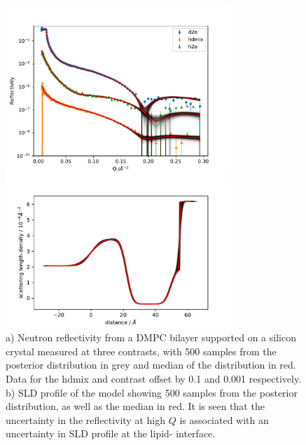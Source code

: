\documentclass[pdf,preprint]{iucr}
\begin{document}
\begin{figure}%
\centering
\label{fig:global_fit}%
\includegraphics[width=85mm]{./supporting_information/global_fit.pdf}%

\includegraphics[width=85mm]{./supporting_information/d2o_sld_spread.pdf}

\caption{a) Neutron reflectivity from a DMPC bilayer supported on a silicon crystal measured at three contrasts, with 500 samples from the posterior distribution in grey and median of the distribution in red. Data for the hdmix and  contrast offset by 0.1 and 0.001 respectively. b) SLD profile of the  model showing 500 samples from the posterior distribution, as well as the median in red. It is seen that the uncertainty in the reflectivity at high $Q$ is associated with an uncertainty in SLD profile at the lipid- interface.}
\end{figure}
\end{document}
